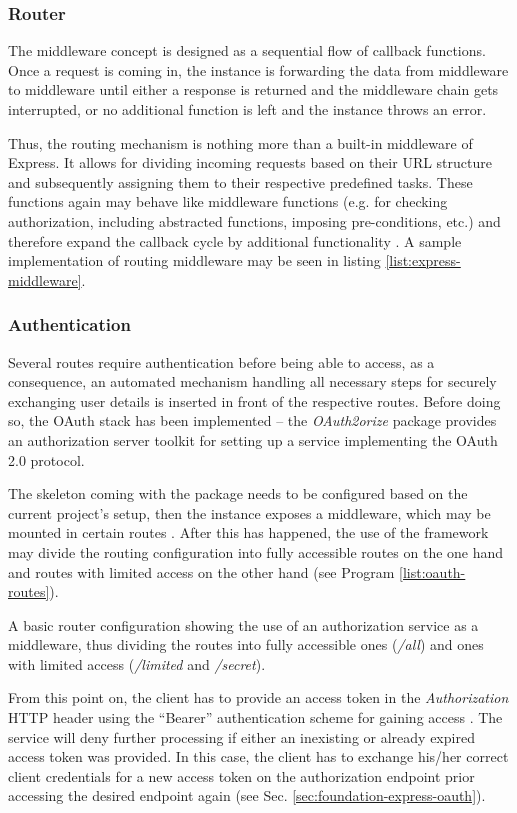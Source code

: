 \subsubsection{Router}
The middleware concept is designed as a sequential flow of callback functions. Once a request is coming in, the instance is forwarding the data from middleware to middleware until either a response is returned and the middleware chain gets interrupted, or no additional function is left and the instance throws an error.

Thus, the routing mechanism is nothing more than a built-in middleware of Express. It allows for dividing incoming requests based on their URL structure and subsequently assigning them to their respective predefined tasks. These functions again may behave like middleware functions (e.g. for checking authorization, including abstracted functions, imposing pre-conditions, etc.) and therefore expand the callback cycle by additional functionality \cite{ExpressRouter}. A sample implementation of routing middleware may be seen in listing \ref{list:express-middleware}.

\subsubsection{Authentication}
Several routes require authentication before being able to access, as a consequence, an automated mechanism handling all necessary steps for securely exchanging user details is inserted in front of the respective routes. Before doing so, the OAuth stack has been implemented -- the \emph{OAuth2orize} package provides an authorization server toolkit for setting up a service implementing the OAuth 2.0 protocol.

The skeleton coming with the package needs to be configured based on the current project's setup, then the instance exposes a middleware, which may be mounted in certain routes \cite{OAuth2orizeGitHub}. After this has happened, the use of the framework may divide the routing configuration into fully accessible routes on the one hand and routes with limited access on the other hand (see Program \ref{list:oauth-routes}).

\begin{program}
  \caption{A basic router configuration showing the use of an authorization service as a middleware, thus dividing the routes into fully accessible ones (\emph{/all}) and ones with limited access (\emph{/limited} and \emph{/secret}).}
  \label{list:oauth-routes}

\end{program}

From this point on, the client has to provide an access token in the \emph{Authorization} HTTP header using the ``Bearer'' authentication scheme for gaining access \cite[5]{RFC6750}. The service will deny further processing if either an inexisting or already expired access token was provided. In this case, the client has to exchange his/her correct client credentials for a new access token on the authorization endpoint prior accessing the desired endpoint again \cite[41]{hardt2012oauth} (see Sec. \ref{sec:foundation-express-oauth}).
